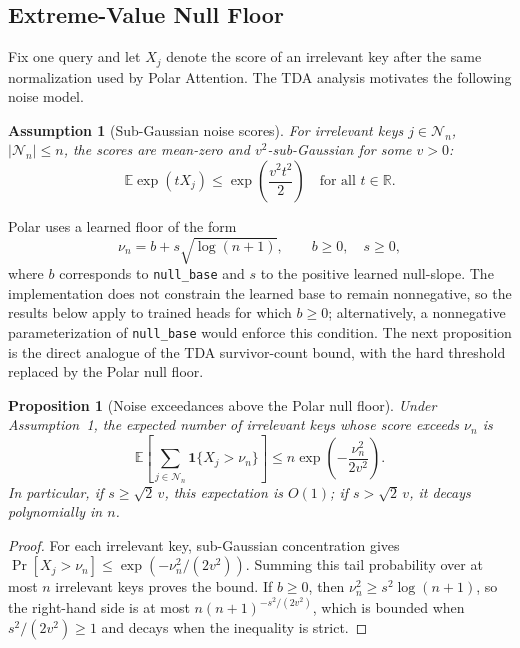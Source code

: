\documentclass{article} %
\newtheorem{assumption}{Assumption}
\newtheorem{proposition}{Proposition}
\begin{document}
\subsection{Extreme-Value Null Floor}

Fix one query and let $X_j$ denote the score of an irrelevant key after the same normalization
used by Polar Attention. The TDA analysis motivates the following noise model.

\begin{assumption}[Sub-Gaussian noise scores]
For irrelevant keys $j \in \mathcal{N}_n$, $|\mathcal{N}_n| \le n$, the scores are mean-zero
and $v^2$-sub-Gaussian for some $v>0$:
\begin{equation}
    \mathbb{E}\exp(tX_j) \le \exp\left(\frac{v^2 t^2}{2}\right)
    \quad \text{for all } t \in \mathbb{R}.
\end{equation}
\end{assumption}

Polar uses a learned floor of the form
\begin{equation}
    \nu_n = b + s\sqrt{\log(n+1)}, \qquad b \ge 0,\quad s \ge 0,
\end{equation}
where $b$ corresponds to \texttt{null\_base} and $s$ to the positive learned null-slope.
The implementation does not constrain the learned base to remain nonnegative, so the results
below apply to trained heads for which $b\ge0$; alternatively, a nonnegative parameterization
of \texttt{null\_base} would enforce this condition.
The next proposition is the direct analogue of the TDA survivor-count bound, with the
hard threshold replaced by the Polar null floor.

\begin{proposition}[Noise exceedances above the Polar null floor]
Under Assumption~1, the expected number of irrelevant keys whose score exceeds $\nu_n$ is
\begin{equation}
    \mathbb{E}\left[\sum_{j \in \mathcal{N}_n} \mathbf{1}\{X_j > \nu_n\}\right]
    \le
    n \exp\left(-\frac{\nu_n^2}{2v^2}\right).
\end{equation}
In particular, if $s \ge \sqrt{2}\,v$, this expectation is $O(1)$; if
$s > \sqrt{2}\,v$, it decays polynomially in $n$.
\end{proposition}

\begin{proof}
For each irrelevant key, sub-Gaussian concentration gives
$\Pr[X_j > \nu_n] \le \exp(-\nu_n^2/(2v^2))$. Summing this tail probability over at most
$n$ irrelevant keys proves the bound. If $b \ge 0$, then
$\nu_n^2 \ge s^2\log(n+1)$, so the right-hand side is at most
$n(n+1)^{-s^2/(2v^2)}$, which is bounded when $s^2/(2v^2)\ge 1$ and decays when the
inequality is strict.
\end{proof}
\end{document}
